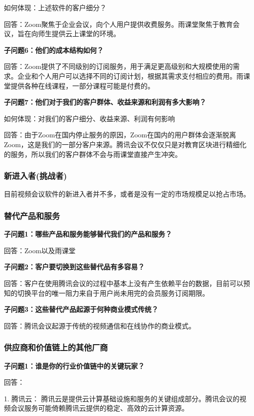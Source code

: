 \documentclass[a4paper,12pt]{article}
\begin{document}
    如何体现：上述软件的客户细分？

    回答：Zoom聚焦于企业会议，向个⼈⽤户提供收费服务。⾬课堂聚焦于教育会议，旨在向师⽣提供云上课堂的环境。
    
    \textbf{子问题6：他们的成本结构如何？}

    回答：Zoom提供了不同级别的订阅服务，用于满足更高级别和大规模使用的需求。企业和个人用户可以选择不同的订阅计划，根据其需求支付相应的费用。雨课堂提供各种在线课程，一部分课程可能是付费的。
    
    \textbf{子问题7：他们对于我们的客户群体、收益来源和利润有多大影响？}

    如何体现：对我们的客户细分、收益来源、利润有何影响

    回答：由于Zoom在国内停⽌服务的原因，Zoom在国内的⽤户群体会逐渐脱离Zoom，这是我们的⼀部分客户来源。腾讯会议不仅仅只是对教育区块进⾏精细化的服务，所以我们的客户群体不会与雨课堂直接产⽣冲突。
    
    \subsubsection{新进入者(挑战者)}
    目前视频会议软件的新进入者并不多，或者是没有⼀定的市场规模足以抢占市场。
    \subsubsection{替代产品和服务}
    \textbf{子问题1：哪些产品和服务能够替代我们的产品和服务？}

    回答：Zoom以及⾬课堂

    \textbf{子问题2：客户要切换到这些替代品有多容易？}

    回答：客户在使⽤腾讯会议的过程中基本上没有产⽣依赖平台的数据，⽬前可以预知的切换平台的唯一阻⼒来⾃于⽤户尚未⽤完的会员服务订阅期限。

    \textbf{子问题3：这些替代产品起源于何种商业模式传统？}

    回答：腾讯会议起源于传统的视频通信和在线协作的商业模式。
    
    \subsubsection{供应商和价值链上的其他厂商}
    \textbf{子问题1：谁是你的行业价值链中的关键玩家？}

    回答：
    
    1. 腾讯云： 腾讯云是提供云计算基础设施和服务的关键组成部分。腾讯会议的视频会议服务可能倚赖腾讯云提供的稳定、高效的云计算资源。
\end{document}
